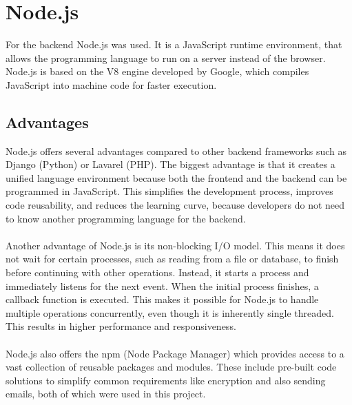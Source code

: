 \documentclass[a4paper,12pt]{report}
\begin{document}
\newpage

\section{Node.js}
For the backend Node.js was used. It is a JavaScript runtime environment, that allows the programming language to run on a server instead of the browser. Node.js is based on the V8 engine developed by Google, which compiles JavaScript into machine code for faster execution. \parencite{nodejs-intro} \\
\subsection{Advantages}  
Node.js offers several advantages compared to other backend frameworks such as Django (Python) or Lavarel (PHP). The biggest advantage is that it creates a unified language environment because both the frontend and the backend can be programmed in JavaScript. This simplifies the development process, improves code reusability, and reduces the learning curve, because developers do not need to know another programming language for the backend. \\\\
Another advantage of Node.js is its non-blocking I/O model. This means it does not wait for certain processes, such as reading from a file or database, to finish before continuing with other operations. Instead, it starts a process and immediately listens for the next event. When the initial process finishes, a callback function is executed. This makes it possible for Node.js to handle multiple operations concurrently, even though it is inherently single threaded. This results in higher performance and responsiveness. \parencite{nodejs-nonblocking} \\\\
Node.js also offers the npm (Node Package Manager) which provides access to a vast collection of reusable packages and modules. These include pre-built code solutions to simplify common requirements like encryption and also sending emails, both of which were used in this project. \parencite{mdn-express-nodejs} \\\\
\end{document}
